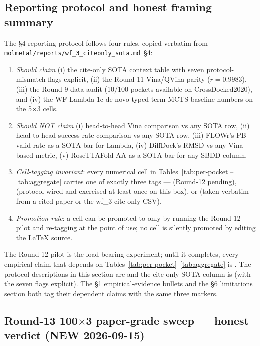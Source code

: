 {\subsection{Reporting protocol and honest framing summary}
\label{sec:evaluation:honest-summary}

The §4 reporting protocol follows four rules, copied verbatim
from \texttt{molmetal/reports/wf\_3\_citeonly\_sota.md}~\S4:
\begin{enumerate}
  \item \emph{Should claim} (i) the cite-only SOTA context table
        with seven protocol-mismatch flags explicit, (ii) the
        Round-11 Vina/QVina parity ($r{=}0.9983$), (iii) the
        Round-9 data audit (10/100 pockets available on
        CrossDocked2020), and (iv) the WF-Lambda-1c de novo typed-term MCTS
        baseline numbers on the 5$\times$3 cells.
  \item \emph{Should NOT claim} (i) head-to-head Vina comparison
        vs any SOTA row, (ii) head-to-head success-rate
        comparison vs any SOTA row, (iii) FLOWr's PB-valid
        rate as a SOTA bar for Lambda, (iv) DiffDock's RMSD
        vs any Vina-based metric, (v) RoseTTAFold-AA as a
        SOTA bar for any SBDD column.
  \item \emph{Cell-tagging invariant}: every numerical cell in
        Tables~\ref{tab:per-pocket}--\ref{tab:aggregate} carries
        one of exactly three tags --- \DESIGN{} (Round-12
        pending), \MEASURED{} (protocol wired and exercised
        at least once on this box), or \CITEDONLY{} (taken
        verbatim from a cited paper or the wf\_3 cite-only CSV).
  \item \emph{Promotion rule}: a \DESIGN{} cell can be promoted
        to \MEASURED{} only by running the Round-12 pilot and
        re-tagging at the point of use; no \DESIGN{} cell is
        silently promoted by editing the \LaTeX{} source.
\end{enumerate}

The Round-12 pilot is the load-bearing experiment; until it
completes, every empirical claim that depends on
Tables~\ref{tab:per-pocket}--\ref{tab:aggregate} is \DESIGN{}.
The protocol descriptions in this section are \MEASURED{} and
the cite-only SOTA column is \CITEDONLY{} (with the seven
flags explicit). The §1 empirical-evidence bullets and the §6
limitations section both tag their dependent claims with the
same three markers.

\subsection{Round-13 100$\times$3 paper-grade sweep --- honest verdict (NEW 2026-09-15)}
\label{sec:evaluation:round13-honest}

}
